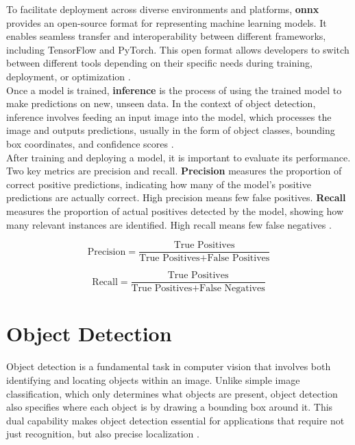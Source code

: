 To facilitate deployment across diverse environments and platforms, \textbf{\gls{onnx}} provides an open-source format for representing machine learning models. It enables seamless transfer and interoperability between different frameworks, including TensorFlow and PyTorch. This open format allows developers to switch between different tools depending on their specific needs during training, deployment, or optimization \cite{roboflow:onnx}.\\

Once a model is trained, \textbf{inference} is the process of using the trained model to make predictions on new, unseen data. In the context of object detection, inference involves feeding an input image into the model, which processes the image and outputs predictions, usually in the form of object classes, bounding box coordinates, and confidence scores \cite{nvidia:inference}. \\

After training and deploying a model, it is important to evaluate its performance. Two key metrics are precision and recall. \textbf{Precision} measures the proportion of correct positive predictions, indicating how many of the model’s positive predictions are actually correct. High precision means few false positives. \textbf{Recall} measures the proportion of actual positives detected by the model, showing how many relevant instances are identified. High recall means few false negatives \cite{builtin:precision-recall}.

\[
\text{Precision} = \frac{\text{True Positives}}{\text{True Positives} + \text{False Positives}}
\]

\[
\text{Recall} = \frac{\text{True Positives}}{\text{True Positives} + \text{False Negatives}}
\]

\section{Object Detection}
\label{sec:object-detection}

Object detection is a fundamental task in computer vision that involves both identifying and locating objects within an image. Unlike simple image classification, which only determines what objects are present, object detection also specifies where each object is by drawing a bounding box around it. This dual capability makes object detection essential for applications that require not just recognition, but also precise localization \cite{ibm:object-detection}. \\

